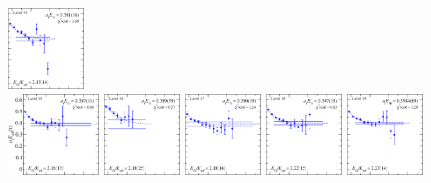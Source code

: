 \begin{figure}[H]
    \includegraphics[width=0.18\textwidth]{figures/sigmas/g1g/fits/fit_16.pdf}\\
    \includegraphics[width=0.215\textwidth]{figures/sigmas/g1g/fits/fit_11.pdf}
    \includegraphics[width=0.18\textwidth]{figures/sigmas/g1g/fits/fit_20.pdf}
    \includegraphics[width=0.18\textwidth]{figures/sigmas/g1g/fits/fit_8.pdf}
    \includegraphics[width=0.18\textwidth]{figures/sigmas/g1g/fits/fit_15.pdf}
    \includegraphics[width=0.18\textwidth]{figures/sigmas/g1g/fits/fit_12.pdf}\\

\end{figure}
